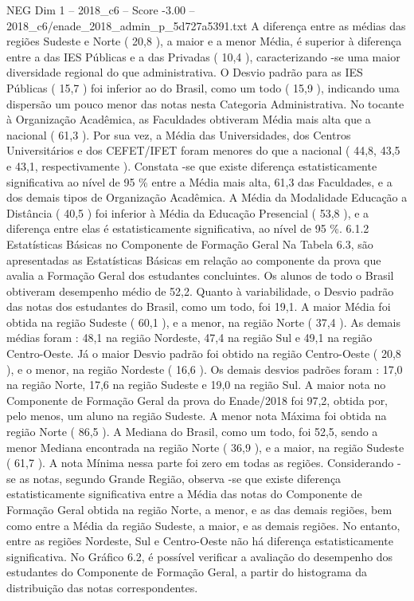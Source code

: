 \begin{textsample}{NEG Dim 1 – 2018\_c6 – Score -3.00 – 2018\_c6/enade\_2018\_admin\_p\_5d727a5391.txt}
A diferença entre as médias das regiões Sudeste e Norte ( 20,8 ), a maior e a menor Média, é superior à diferença entre a das IES Públicas e a das Privadas ( 10,4 ), caracterizando -se uma maior diversidade regional do que administrativa.
O Desvio padrão para as IES Públicas ( 15,7 ) foi inferior ao do Brasil, como um todo ( 15,9 ), indicando uma dispersão um pouco menor das notas nesta Categoria Administrativa.
No tocante à Organização Acadêmica, as Faculdades obtiveram Média mais alta que a nacional ( 61,3 ).
Por sua vez, a Média das Universidades, dos Centros Universitários e dos CEFET/IFET foram menores do que a nacional ( 44,8, 43,5 e 43,1, respectivamente ).
Constata -se que existe diferença estatisticamente significativa ao nível de 95 \% entre a Média mais alta, 61,3 das Faculdades, e a dos demais tipos de Organização Acadêmica.
A Média da Modalidade Educação a Distância ( 40,5 ) foi inferior à Média da Educação Presencial ( 53,8 ), e a diferença entre elas é estatisticamente significativa, ao nível de 95 \%. 6.1.2 Estatísticas Básicas no Componente de Formação Geral Na Tabela 6.3, são apresentadas as Estatísticas Básicas em relação ao componente da prova que avalia a Formação Geral dos estudantes concluintes.
Os alunos de todo o Brasil obtiveram desempenho médio de 52,2.
Quanto à variabilidade, o Desvio padrão das notas dos estudantes do Brasil, como um todo, foi 19,1.
A maior Média foi obtida na região Sudeste ( 60,1 ), e a menor, na região Norte ( 37,4 ).
As demais médias foram : 48,1 na região Nordeste, 47,4 na região Sul e 49,1 na região Centro-Oeste.
Já o maior Desvio padrão foi obtido na região Centro-Oeste ( 20,8 ), e o menor, na região Nordeste ( 16,6 ).
Os demais desvios padrões foram : 17,0 na região Norte, 17,6 na região Sudeste e 19,0 na região Sul.
A maior nota no Componente de Formação Geral da prova do Enade/2018 foi 97,2, obtida por, pelo menos, um aluno na região Sudeste.
A menor nota Máxima foi obtida na região Norte ( 86,5 ).
A Mediana do Brasil, como um todo, foi 52,5, sendo a menor Mediana encontrada na região Norte ( 36,9 ), e a maior, na região Sudeste ( 61,7 ).
A nota Mínima nessa parte foi zero em todas as regiões.
Considerando -se as notas, segundo Grande Região, observa -se que existe diferença estatisticamente significativa entre a Média das notas do Componente de Formação Geral obtida na região Norte, a menor, e as das demais regiões, bem como entre a Média da região Sudeste, a maior, e as demais regiões.
No entanto, entre as regiões Nordeste, Sul e Centro-Oeste não há diferença estatisticamente significativa.
No Gráfico 6.2, é possível verificar a avaliação do desempenho dos estudantes do Componente de Formação Geral, a partir do histograma da distribuição das notas correspondentes.

\end{textsample}
